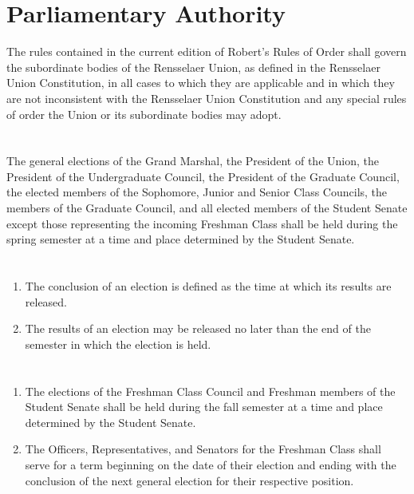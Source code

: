 \documentclass{uniondoc}
\begin{document}
\section{Parliamentary Authority}

The rules contained in the current edition of Robert's Rules of Order shall govern the subordinate bodies of the Rensselaer Union, as defined in the Rensselaer Union Constitution, in all cases to which they are applicable and in which they are not inconsistent with the Rensselaer Union Constitution and any special rules of order the Union or its subordinate bodies may adopt.


\section{}

The general elections of the Grand Marshal, the President of the Union, the President of the Undergraduate Council, the President of the Graduate Council, the elected members of the Sophomore, Junior and Senior Class Councils, the members of the Graduate Council, and all elected members of the Student Senate except those representing the incoming Freshman Class shall be held during the spring semester at a time and place determined by the Student Senate.

\section{}

\begin{enumerate}
	\item The conclusion of an election is defined as the time at which its results are released.
	\item The results of an election may be released no later than the end of the semester in which the election is held.
\end{enumerate}

\section{}

\begin{enumerate}
	\item The elections of the Freshman Class Council and Freshman members of the Student Senate shall be held during the fall semester at a time and place determined by the Student Senate.
	\item The Officers, Representatives, and Senators for the Freshman Class shall serve for a term beginning on the date of their election and ending with the conclusion of the next general election for their respective position.
\end{enumerate}
\end{document}
